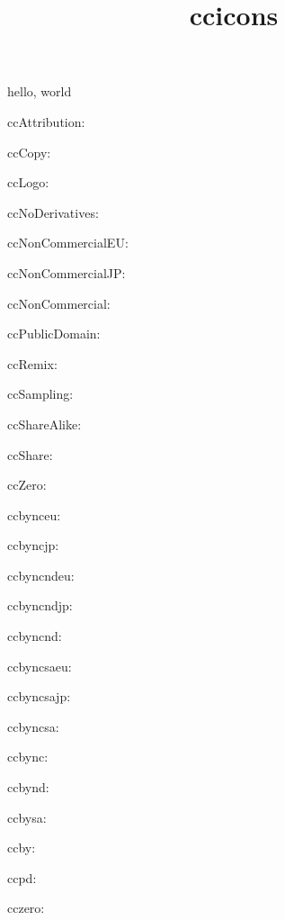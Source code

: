\documentclass{amsart}
\title{ccicons}
\begin{document}
\maketitle

hello, world

ccAttribution: \ccAttribution

ccCopy: \ccCopy

ccLogo: \ccLogo

ccNoDerivatives: \ccNoDerivatives

ccNonCommercialEU: \ccNonCommercialEU

ccNonCommercialJP: \ccNonCommercialJP

ccNonCommercial: \ccNonCommercial


ccPublicDomain: \ccPublicDomain

ccRemix: \ccRemix

ccSampling: \ccSampling

ccShareAlike: \ccShareAlike

ccShare: \ccShare

ccZero: \ccZero

ccbynceu: \ccbynceu

ccbyncjp: \ccbyncjp

ccbyncndeu: \ccbyncndeu

ccbyncndjp: \ccbyncndjp

ccbyncnd: \ccbyncnd

ccbyncsaeu: \ccbyncsaeu

ccbyncsajp: \ccbyncsajp

ccbyncsa: \ccbyncsa

ccbync: \ccbync

ccbynd: \ccbynd

ccbysa: \ccbysa

ccby: \ccby

ccpd: \ccpd

cczero: \cczero
\end{document}
